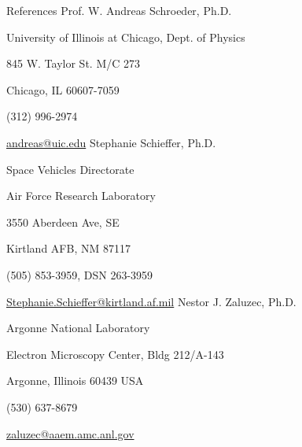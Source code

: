 \begin{rubric}{References}
  \entry* [Ph.D. Advisor] 
    Prof. W. Andreas Schroeder, Ph.D.\par
    University of Illinois at Chicago, Dept. of Physics\par
    845 W. Taylor St. M/C 273\par
    Chicago, IL 60607-7059\par
    (312) 996-2974\par
    \url{andreas@uic.edu}
    Stephanie Schieffer, Ph.D.\par
    Space Vehicles Directorate\par
    Air Force Research Laboratory\par
    3550 Aberdeen Ave, SE\par
    Kirtland AFB, NM 87117\par
    (505) 853-3959, DSN 263-3959\par
    \url{Stephanie.Schieffer@kirtland.af.mil}
    Nestor J. Zaluzec, Ph.D.\par
    Argonne National Laboratory\par
    Electron Microscopy Center, Bldg 212/A-143\par
    Argonne, Illinois 60439 USA\par
    (530) 637-8679\par
    \url{zaluzec@aaem.amc.anl.gov}
\end{rubric}

